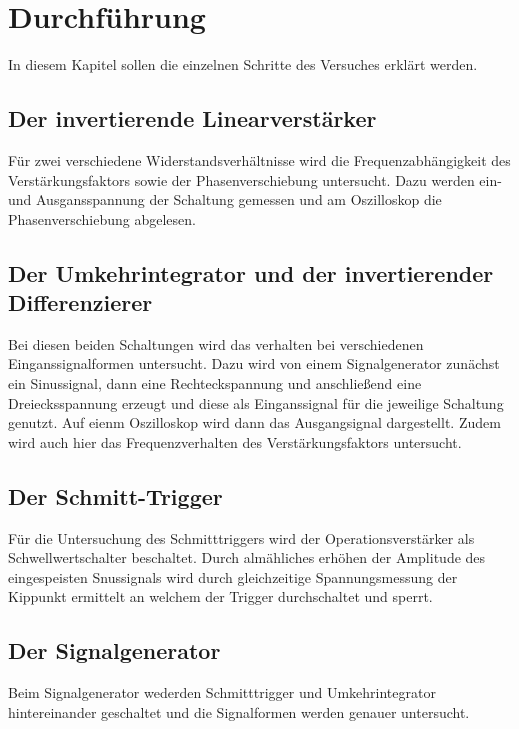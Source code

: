 \section{Durchführung}
\label{sec:Durchfuehrung}
In diesem Kapitel sollen die einzelnen Schritte des Versuches erklärt werden.
\subsection{Der invertierende Linearverstärker}
Für zwei verschiedene Widerstandsverhältnisse wird die Frequenzabhängigkeit 
des Verstärkungsfaktors sowie der Phasenverschiebung untersucht. Dazu werden ein- 
und Ausgansspannung der Schaltung gemessen und am Oszilloskop die Phasenverschiebung abgelesen.

\subsection{Der Umkehrintegrator und der invertierender Differenzierer}
Bei diesen beiden Schaltungen wird das verhalten bei verschiedenen Einganssignalformen untersucht.
Dazu wird von einem Signalgenerator zunächst ein Sinussignal, dann eine Rechteckspannung und anschließend
eine Dreiecksspannung erzeugt und diese als Einganssignal für die jeweilige Schaltung genutzt.
Auf eienm Oszilloskop wird dann das Ausgangsignal dargestellt.
Zudem wird auch hier das Frequenzverhalten des Verstärkungsfaktors untersucht.

\subsection{Der Schmitt-Trigger}
Für die Untersuchung des Schmitttriggers wird der Operationsverstärker als Schwellwertschalter
beschaltet. Durch almähliches erhöhen der Amplitude des eingespeisten Snussignals wird durch gleichzeitige
Spannungsmessung der Kippunkt ermittelt an welchem der Trigger durchschaltet und sperrt.

\subsection{Der Signalgenerator}
Beim Signalgenerator wederden Schmitttrigger und Umkehrintegrator hintereinander geschaltet und 
die Signalformen werden genauer untersucht.